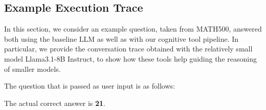 


\newpage

\subsection{Example Execution Trace}

In this section, we consider an example question, taken from MATH500, answered both using the baseline LLM as well as with our cognitive tool pipeline. In particular, we provide the conversation trace obtained with the relatively small model Llama3.1-8B Instruct, to show how these tools help guiding the reasoning of smaller models.

The question that is passed as user input is as follows:

\begin{center}
\end{center}

The actual correct answer is \textbf{21}.

\vspace{0.1cm}


